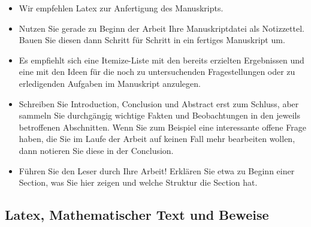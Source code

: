 \documentclass[12pt,a4paper]{article}
\begin{document}
\begin{itemize}
\item Wir empfehlen Latex zur Anfertigung des Manuskripts.
\item Nutzen Sie gerade zu Beginn der Arbeit Ihre Manuskriptdatei als Notizzettel. Bauen Sie diesen dann Schritt für Schritt in ein fertiges Manuskript um.
\item Es empfiehlt sich eine Itemize-Liste mit den bereits erzielten Ergebnissen und eine mit den Ideen für die noch zu untersuchenden Fragestellungen oder zu erledigenden Aufgaben im Manuskript anzulegen.
\item Schreiben Sie Introduction, Conclusion und Abstract erst zum Schluss, aber sammeln
  Sie durchgängig wichtige Fakten und Beobachtungen in den jeweils betroffenen
  Abschnitten. Wenn Sie zum Beispiel eine interessante offene Frage haben, die Sie im
  Laufe der Arbeit auf keinen Fall mehr bearbeiten wollen, dann notieren Sie diese in der Conclusion.
\item Führen Sie den Leser durch Ihre Arbeit! Erklären Sie etwa zu Beginn einer Section,
  was Sie hier zeigen und welche Struktur die Section hat.
\end{itemize}

\subsection{Latex, Mathematischer Text und Beweise}
\end{document}
